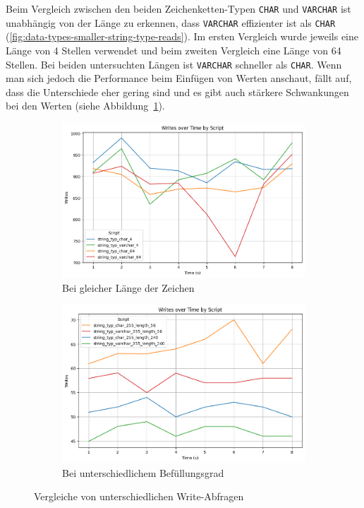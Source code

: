 Beim Vergleich zwischen den beiden Zeichenketten-Typen \texttt{CHAR} und \texttt{VARCHAR} ist unabhängig von der Länge zu erkennen, dass \texttt{VARCHAR} effizienter ist als \texttt{CHAR} (\ref{fig:data-types-smaller-string-type-reads}).
Im ersten Vergleich wurde jeweils eine Länge von 4 Stellen verwendet und beim zweiten Vergleich eine Länge von 64 Stellen.
Bei beiden untersuchten Längen ist \texttt{VARCHAR} schneller als \texttt{CHAR}.
Wenn man sich jedoch die Performance beim Einfügen von Werten anschaut, fällt auf, dass die Unterschiede eher gering sind und es gibt auch stärkere Schwankungen bei den Werten (siehe Abbildung~\ref{fig:data-types-smaller-string-type-writes}).

\vspace{-12pt}
\begin{figure}[H]
    \centering
    \begin{subfigure}[t]{0.48\textwidth}
        \centering
        \includegraphics[width=\textwidth]{PNGs/Script/Data_Types/Smaller/string-type/Writes}
        \caption{Bei gleicher Länge der Zeichen}
        \label{fig:data-types-smaller-string-type-writes}
    \end{subfigure}
    \hfill
    \begin{subfigure}[t]{0.48\textwidth}
        \centering
        \includegraphics[width=\textwidth]{PNGs/Script/Data_Types/Smaller/string-type-length/Writes}
        \caption{Bei unterschiedlichem Befüllungsgrad}
        \label{fig:data-types-smaller-string-type-length-writes}
    \end{subfigure}
    \caption{Vergleiche von unterschiedlichen Write-Abfragen}
\end{figure}

